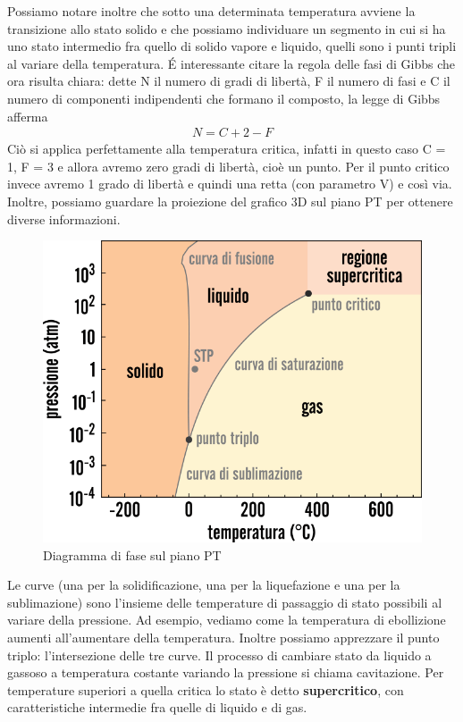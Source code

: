 \documentclass[10pt,a4paper]{article}
\begin{document}
\FloatBarrier
Possiamo notare inoltre che sotto una determinata temperatura avviene la transizione allo stato solido e che possiamo individuare un segmento in cui si ha uno stato intermedio fra quello di solido vapore e liquido, quelli sono i punti tripli al variare della temperatura. \'{E} interessante citare la regola delle fasi di Gibbs che ora risulta chiara: dette N il numero di gradi di libertà, F il numero di fasi e C il numero di componenti indipendenti che formano il composto, la legge di Gibbs afferma
\begin{align*}
	N = C + 2 - F
\end{align*} 
Ciò si applica perfettamente alla temperatura critica, infatti in questo caso C = 1, F = 3 e allora avremo zero gradi di libertà, cioè un punto. Per il punto critico invece avremo 1 grado di libertà e quindi una retta (con parametro V) e così via.\\
Inoltre, possiamo guardare la proiezione del grafico 3D sul piano PT per ottenere diverse informazioni. 
\begin{figure}[h!]
	\centering
	\includegraphics[width=0.6\linewidth]{diagrammadifasePT}
	\caption{Diagramma di fase sul piano PT}
	\label{fig:diagrammadifasept}
\end{figure}
\FloatBarrier
Le curve (una per la solidificazione, una per la liquefazione e una per la sublimazione) sono l'insieme delle temperature di passaggio di stato possibili al variare della pressione. Ad esempio, vediamo come la temperatura di ebollizione aumenti all'aumentare della temperatura. Inoltre possiamo apprezzare il punto triplo: l'intersezione delle tre curve. Il processo di cambiare stato da liquido a gassoso a temperatura costante variando la pressione si chiama cavitazione. Per temperature superiori a quella critica lo stato è detto \textbf{supercritico}, con caratteristiche intermedie fra quelle di liquido e di gas. 
\end{document}
